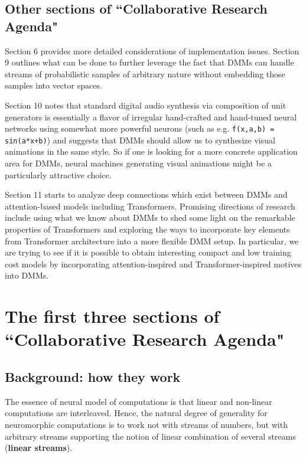 \documentclass{article}
\begin{document}
\subsection{Other sections of ``Collaborative Research Agenda"}

Section 6 provides more detailed considerations of implementation issues. Section 9 outlines
what can be done to further leverage the fact that DMMs can handle streams of probabilistic
samples of arbitrary nature without embedding those samples into vector spaces. 

Section 10 notes that standard digital audio synthesis via composition of unit generators is essentially
a flavor of irregular hand-crafted and hand-tuned neural networks using somewhat more powerful
neurons (such as e.g. {\tt f(x,a,b) = sin(a*x+b)}) and suggests that DMMs should allow us to synthesize visual animations in the same style.
So if one is looking for a more concrete application area for DMMs, neural machines generating
visual animations might be a particularly attractive choice.

Section 11 starts to analyze deep connections which exist between DMMs and attention-based models including
Transformers. Promising directions of research include using what we know about DMMs to
shed some light on the remarkable properties of Transformers and exploring the ways to incorporate key elements from Transformer architecture into a more flexible DMM setup. In particular, we are trying to see
if it is possible to obtain interesting compact and low training cost models by 
incorporating attention-inspired and Transformer-inspired motives into DMMs.


\appendix

\section{The first three sections of ``Collaborative Research Agenda"}

\subsection{Background: how they work}

The essence of neural model of computations is that linear and non-linear computations are interleaved. Hence, the natural
degree of generality for neuromorphic computations is to work not with streams of numbers, but with arbitrary streams
supporting the notion of linear combination of several streams ({\bf linear streams}).
\end{document}
